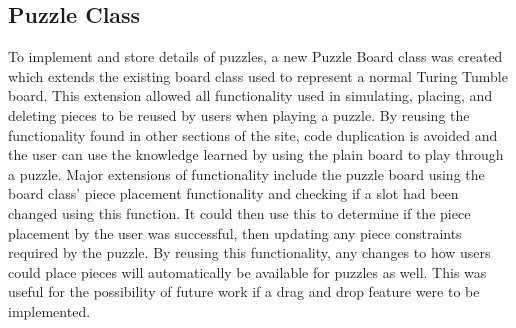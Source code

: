 \documentclass{l4proj}
\begin{document}
\subsection{Puzzle Class}
To implement and store details of puzzles, a new Puzzle Board class was created which extends the existing board class used to represent a normal Turing Tumble board. This extension allowed all functionality used in simulating, placing, and deleting pieces to be reused by users when playing a puzzle. By reusing the functionality found in other sections of the site, code duplication is avoided and the user can use the knowledge learned by using the plain board to play through a puzzle. Major extensions of functionality include the puzzle board using the board class' piece placement functionality and checking if a slot had been changed using this function. It could then use this to determine if the piece placement by the user was successful, then updating any piece constraints required by the puzzle. By reusing this functionality, any changes to how users could place pieces will automatically be available for puzzles as well. This was useful for the possibility of future work if a drag and drop feature were to be implemented. 



\end{document}
